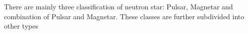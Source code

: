 There are mainly three classification of neutron star: Pulsar, Magnetar and combination of Pulsar and Magnetar. These classes are further subdivided into other types



